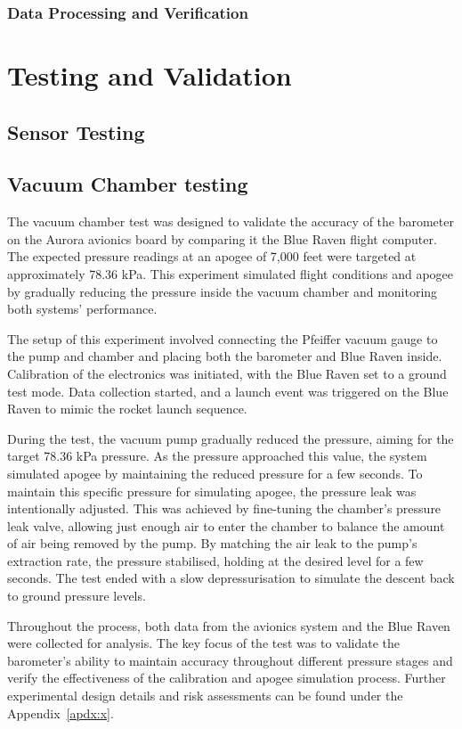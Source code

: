 \subsubsection{Data Processing and Verification}

\section{Testing and Validation}
\subsection{Sensor Testing}
\subsection{Vacuum Chamber testing}
The vacuum chamber test was designed to validate the accuracy of the barometer on the Aurora avionics board by comparing it the Blue Raven flight computer. The expected pressure readings at an apogee of 7,000 feet were targeted at approximately 78.36 kPa. This experiment simulated flight conditions and apogee by gradually reducing the pressure inside the vacuum chamber and monitoring both systems' performance. 

The setup of this experiment involved connecting the Pfeiffer vacuum gauge to the pump and chamber and placing both the barometer and Blue Raven inside. Calibration of the electronics was initiated, with the Blue Raven set to a ground test mode. Data collection started, and a launch event was triggered on the Blue Raven to mimic the rocket launch sequence. 

During the test, the vacuum pump gradually reduced the pressure, aiming for the target 78.36 kPa pressure. As the pressure approached this value, the system simulated apogee by maintaining the reduced pressure for a few seconds. To maintain this specific pressure for simulating apogee, the pressure leak was intentionally adjusted. This was achieved by fine-tuning the chamber’s pressure leak valve, allowing just enough air to enter the chamber to balance the amount of air being removed by the pump. By matching the air leak to the pump’s extraction rate, the pressure stabilised, holding at the desired level for a few seconds. The test ended with a slow depressurisation to simulate the descent back to ground pressure levels. 

Throughout the process, both data from the avionics system and the Blue Raven were collected for analysis. The key focus of the test was to validate the barometer’s ability to maintain accuracy throughout different pressure stages and verify the effectiveness of the calibration and apogee simulation process. Further experimental design details and risk assessments can be found under the Appendix~\ref{apdx:x}. 

